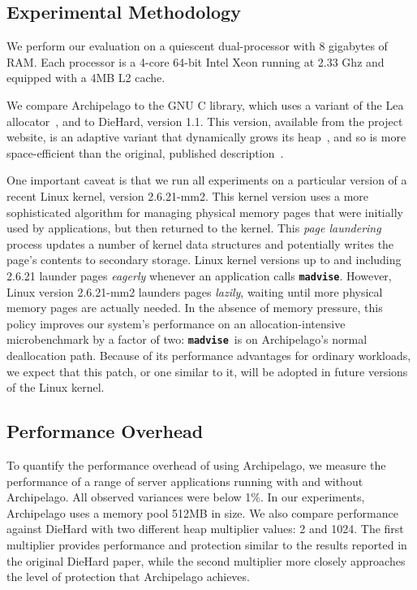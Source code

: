 \documentclass{acm_proc_article-sp}
\newcommand{\cfunction}[1]{{\bf \tt #1}}
\newcommand{\madvise}{\cfunction{madvise}}
\begin{document}
\subsection{Experimental Methodology}


\noindent
We perform our evaluation on a quiescent dual-processor with 8
gigabytes of RAM. Each processor is a 4-core 64-bit Intel Xeon running at
2.33 Ghz and equipped with a 4MB L2 cache.

We compare Archipelago to the GNU C library, which uses a variant of
the Lea allocator~\cite{lea97}, and to DieHard, version 1.1. This
version, available from the project website, is an adaptive variant
that dynamically grows its heap~\cite{berg07}, and so is more
space-efficient than the original, published
description~\cite{1134000}.

One important caveat is that we run all experiments on a particular
version of a recent Linux kernel, version 2.6.21-mm2. This kernel
version uses a more sophisticated algorithm for managing physical
memory pages that were initially used by applications, but then
returned to the kernel. This \emph{page laundering} process updates a
number of kernel data structures and potentially writes the page's
contents to secondary storage. Linux kernel versions up to and
including 2.6.21 launder pages \emph{eagerly} whenever an application calls
\madvise. However, Linux version 2.6.21-mm2 launders pages \emph{lazily}, waiting until
more physical memory pages are actually needed. In the absence of
memory pressure, this policy improves our system's performance on an
allocation-intensive microbenchmark by a factor of two: \madvise\ is
on Archipelago's normal deallocation path. Because of its performance
advantages for ordinary workloads, we expect that this patch, or one
similar to it, will be adopted in future versions of the Linux kernel.

\subsection{Performance Overhead}
\label{sec:eval-runtime}

\noindent
To quantify the performance overhead of using Archipelago, we measure
the performance of a range of server applications running with and
without Archipelago. All observed variances were below 1\%. In our
experiments, Archipelago uses a memory pool 512MB in size. We also
compare performance against DieHard with two different heap multiplier
values: 2 and 1024. The first multiplier provides performance and
protection similar to the results reported in the original DieHard
paper, while the second multiplier more closely approaches the level of
protection that Archipelago achieves.
\end{document}
